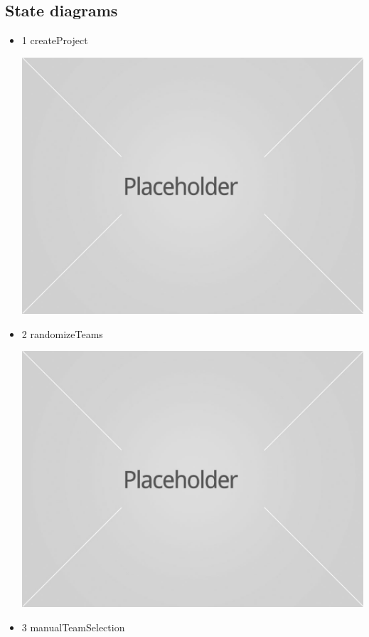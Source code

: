 \documentclass[hidelinks, 12pt, oneside]{article}
\begin{document}
\subsection{State diagrams}
\begin{itemize}
\item 1 createProject
\par
\includegraphics[width=13cm]{image.jpg}
    \rule{0\linewidth}{0.15\linewidth}\par
\item 2 randomizeTeams
\par
\includegraphics[width=13cm]{image.jpg}
    \rule{0\linewidth}{0.15\linewidth}\par
\item 3 manualTeamSelection
\par

\end{itemize}
\end{document}
